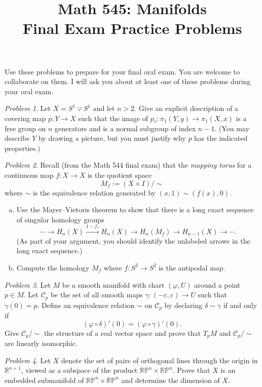 \documentclass[11pt,twoside]{amsart}
\title{Math 545: Manifolds\\ Final Exam Practice Problems}
\theoremstyle{plain}
\theoremstyle{remark}
\newtheorem{prob}{Problem}
\theoremstyle{definition}
\theoremstyle{definition}
\newcommand{\RR}{\mathbb{R}}
\newcommand{\PP}{\mathbb{P}}
\begin{document}
\maketitle

\noindent Use these problems to prepare for your final oral exam. You are welcome to collaborate on them. I will ask you about at least one of these problems during your oral exam.

\begin{prob}
Let $X = S^1\vee S^1$ and let $n>2$. Give an explicit description of a covering map $p\colon Y\to X$ such that the image of $p_*\colon \pi_1(Y,y)\to \pi_1(X,x)$ is a free group on $n$ generators and is a normal subgroup of index $n-1$. (You may describe $Y$ by drawing a picture, but you must justify why $p$ has the indicated properties.)
\end{prob}

\begin{prob}
Recall (from the Math 544 final exam) that the \emph{mapping torus} for a continuous map $f\colon X\to X$ is the quotient space
\[
  M_f := (X\times I)/{\sim}
\]
where $\sim$ is the equivalence relation generated by $(x,1)\sim (f(x),0)$.
\begin{enumerate}[(a)]
\item Use the Mayer--Vietoris theorem to show that there is a long exact sequence of singular homology groups
\[
  \cdots \to H_n(X)\xrightarrow{1-f_*} H_n(X)\to H_n(M_f)\to H_{n-1}(X)\to \cdots.
\]
(As part of your argument, you should identify the unlabeled arrows in the long exact sequence.)
\item Compute the homology $M_f$ where $f\colon S^2\to S^2$ is the antipodal map.
\end{enumerate}
\end{prob}

\begin{prob}
Let $M$ be a smooth manifold with chart $(\varphi,U)$ around a point $p\in M$. Let $\mathcal C_p$ be the set of all smooth maps $\gamma\colon (-\varepsilon,\varepsilon)\to U$ such that $\gamma(0)=p$. Define an equivalence relation $\sim$ on $\mathcal C_p$ by declaring $\delta\sim \gamma$ if and only if
\[
  (\varphi\circ \delta)'(0) = (\varphi\circ \gamma)'(0).
\]
Give $\mathcal C_p/{\sim}$ the structure of a real vector space and prove that $T_pM$ and $\mathcal C_p/{\sim}$ are linearly isomorphic.
\end{prob}

\begin{prob}
Let $X$ denote the set of pairs of orthogonal lines through the origin in $\RR^{n+1}$, viewed as a subspace of the product $\RR\PP^n\times \RR\PP^n$. Prove that $X$ is an embedded submanifold of $\RR\PP^n\times \RR\PP^n$ and determine the dimension of $X$. 
\end{prob}
\end{document}
